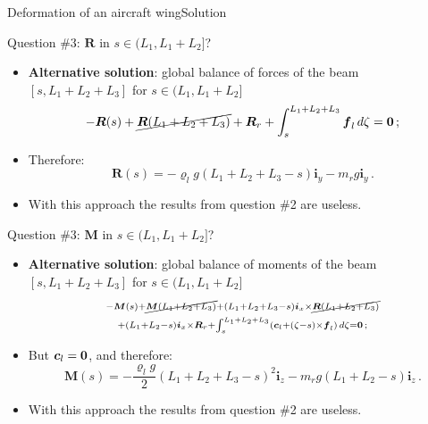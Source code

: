 \documentclass{beamer}
\newcommand{\id}{d}
\newcommand{\cj}{c}
\newcommand{\cv}{{\boldsymbol\cj}}
\newcommand{\xj}{x}
\newcommand{\yj}{y}
\newcommand{\zj}{z}
\renewcommand{\ij}{i}
\newcommand{\iv}{{\boldsymbol\ij}}
\newcommand{\fj}{f}
\newcommand{\fv}{{\boldsymbol\fj}}
\newcommand{\roi}{\varrho}
\newcommand{\Fresj}{R}
\newcommand{\Mresj}{M}
\newcommand{\Fres}{{\boldsymbol\Fresj}}
\newcommand{\Mres}{{\boldsymbol\Mresj}}
\newcommand{\bzero}{{\bf 0}}
\begin{document}
\begin{frame}{Deformation of an aircraft wing}{Solution}
\begin{overprint}
\vskip-20pt
\begin{exampleblock}{Question \#3: $\Fres$ in $s\in(L_1,L_1+L_2]$?}
\begin{itemize}
\item {\bf Alternative solution}: global balance of forces of the beam $[s,L_1+L_2+L_3]$ for $s\in(L_1,L_1+L_2]$
\begin{displaymath}
-\Fres(s)+\cancel{\Fres(L_1+L_2+L_3)}+\Fres_r+\int_s^{L_1+L_2+L_3}\fv_l\,\id\zeta=\bzero\,;
\end{displaymath}
\item Therefore:
\begin{displaymath}
\Fres(s)=-\roi_l g(L_1+L_2+L_3-s)\iv_\yj-m_r g\iv_\yj\,.
\end{displaymath}
\item With this approach the results from question \#2 are useless.
\end{itemize}
\end{exampleblock}

\vskip-20pt
\begin{exampleblock}{Question \#3: $\Mres$ in $s\in(L_1,L_1+L_2]$?}
\begin{itemize}
\item {\bf Alternative solution}: global balance of moments of the beam $[s,L_1+L_2+L_3]$ for $s\in(L_1,L_1+L_2]$
\begin{multline*}
\scriptstyle -\Mres(s)+\cancel{\Mres(L_1+L_2+L_3)} +(L_1+L_2+L_3-s)\iv_\xj\times\cancel{\Fres(L_1+L_2+L_3)} \\
\scriptstyle +(L_1+L_2-s)\iv_\xj\times\Fres_r +\int_s^{L_1+L_2+L_3}(\cv_l+(\zeta-s)\times\fv_l)\,\id\zeta=\bzero\,;
\end{multline*}
\item But $\cv_l=\bzero$, and therefore:
\begin{displaymath}
\Mres(s)=-\frac{\roi_l g}{2}(L_1+L_2+L_3-s)^2\iv_\zj-m_r g(L_1+L_2-s)\iv_\zj\,.
\end{displaymath}
\item With this approach the results from question \#2 are useless.
\end{itemize}
\end{exampleblock}

\end{overprint}

\end{frame}
\end{document}
